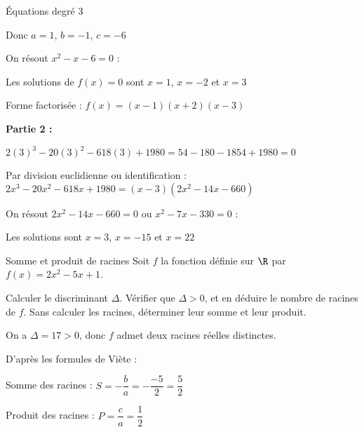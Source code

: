 \begin{EXO}{Équations degré 3}{}
\begin{tcbenumerate}[1]
\begin{tcbenumerate}[1][1][alph]
Donc $a=1$, $b=-1$, $c=-6$

\tcbitem On résout $x^2-x-6=0$ :


\tcbitem Les solutions de $f(x)=0$ sont $x=1$, $x=-2$ et $x=3$

Forme factorisée : $f(x) = (x-1)(x+2)(x-3)$
\end{tcbenumerate}

\tcbitem \textbf{Partie 2 :}
\begin{tcbenumerate}[1][1][alph]
\tcbitem $2(3)^3-20(3)^2-618(3)+1980 = 54-180-1854+1980 = 0$ \checkmark

Par division euclidienne ou identification : $2x^3-20x^2-618x+1980 = (x-3)(2x^2-14x-660)$

\tcbitem On résout $2x^2-14x-660=0$ ou $x^2-7x-330=0$ :


Les solutions sont $x=3$, $x=-15$ et $x=22$
\end{tcbenumerate}
\end{tcbenumerate}
\end{EXO}


\vspace{-3mm}
\def\rdifficulty{1.5}
\begin{EXO}{Somme et produit de racines}{}
Soit $f$ la fonction définie sur $\R$ par $f(x)=2x^2-5x+1$.
\begin{tcbenumerate}[2]
\tcbitem {} Calculer le discriminant $\Delta$.
\tcbitem {} Vérifier que $\Delta >0$, et en déduire le nombre de racines de $f$.
\tcbitem[raster multicolumn=2]  Sans calculer les racines, déterminer leur somme et leur produit.
\end{tcbenumerate}

\exocorrection

\begin{tcbenumerate}[1]
\tcbitem {}

\tcbitem On a $\Delta = 17 > 0$, donc $f$ admet deux racines réelles distinctes.

\tcbitem D'après les formules de Viète :

Somme des racines : $S = -\dfrac{b}{a} = -\dfrac{-5}{2} = \dfrac{5}{2}$

Produit des racines : $P = \dfrac{c}{a} = \dfrac{1}{2}$
\end{tcbenumerate}
\end{EXO}

